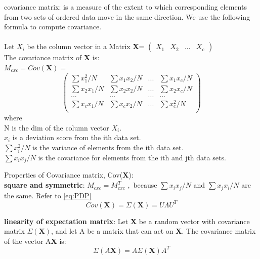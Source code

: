 \documentclass[a4paper,12pt]{article}
\begin{document}
\begin{compactitem}
\item covariance matrix: is a measure of the extent to which corresponding elements from two sets 
of ordered data move in the same direction. We use the following formula to compute covariance.
\cite{wiki-covariance}\cite{STAT-covariance}\\
\\Let $X_i$ be the column vector in a Matrix \textbf{X}=
$\begin{pmatrix} X_1 & X_2 &... & X_c \end{pmatrix}$\\
The covariance matrix of \textbf{X} is:\\
$M_{cxc} = Cov(\textbf{X})=$
\begin{equation}
\label{eq:covarm1}
\begin{pmatrix}
       \sum x_1^{2}/N 	& \sum x_1 x_2/N 	& ...	& \sum x_1 x_c/N	\\[0.3em]
       \sum x_2 x_1/N 	& \sum x_2 x_2/N 	& ...	& \sum x_2 x_c/N	\\[0.3em]
       ...		& ...			& ...	&	...		\\[0.3em]
       \sum x_c x_1/N 	& \sum x_c x_2/N 	& ...	& \sum x_c^{2}/N	\\[0.3em]
\end{pmatrix}
\end{equation}
where\\
N is the dim of the column vector $X_i$.\\
$x_i$ is a deviation score from the ith data set.\\
$\sum x_i^2 / N$ is the variance of elements from the ith data set.\\
$\sum x_i x_j / N$ is the covariance for elements from the ith and jth data sets.\\

\item Properties of Covariance matrix, Cov(\textbf{X}):\\
\textbf{square and symmetric}: $M_{cxc}=M_{cxc}^T$ ,\ because $\sum x_i x_j / N$ and $\sum x_j x_i / N$ are the same. Refer to \eqref{eq:PDP}
\begin{equation}
\label{eq:covd}
Cov(\textbf{X}) = \Sigma(\textbf{X}) = U\Lambda U^T
\end{equation}

\textbf{linearity of expectation matrix}: Let \textbf{X} be a random vector with covariance matrix
$\Sigma(\textbf{X})$, and let A be a matrix that can act on \textbf{X}. The covariance matrix of the vector A\textbf{X} is:
\begin{equation}
\label{eq:covlinear}
\Sigma(A\textbf{X}) = A\Sigma(\textbf{X})A^{T}
\end{equation}


\end{compactitem}
\end{document}
